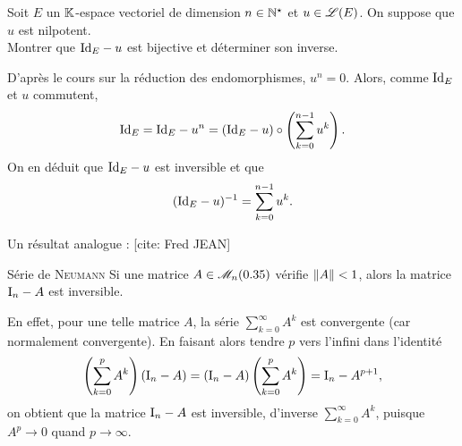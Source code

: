 \begin{exercice}
    Soit $E$ un $\mathbb{K}$-espace vectoriel de dimension $n \in \mathbb{N}^\star$ et $u \in \mathscr{L}(E)$. On suppose que $u$ est nilpotent. \\
    Montrer que $\mathrm{Id}_E - u$ est bijective et déterminer son inverse.
\end{exercice}


\begin{solution}
    D'après le cours sur la réduction des endomorphismes, $u^n = 0$. Alors, comme $\mathrm{Id}_E$ et $u$ commutent, 
    $$\mathrm{Id}_E = \mathrm{Id}_E - u^n = (\mathrm{Id}_E - u) \circ \left( \sum_{k = 0}^{n-1} u^k \right).$$
    On en déduit que $\mathrm{Id}_E - u$ est inversible et que 
    $$(\mathrm{Id}_E - u)^{-1} = \sum_{k = 0}^{n-1} u^k.$$
\end{solution}

Un résultat analogue : [cite: Fred JEAN]\\
\begin{prop}{Série de \textsc{Neumann}}
    Si une matrice $A \in \mathscr{M}_n(0.35)$ vérifie $\Vert A \Vert < 1$, alors la matrice $\mathrm{I}_n - A$ est inversible. 
\end{prop}

\begin{preuve}
    En effet, pour une telle matrice $A$, la série $\sum\limits_{k=0}^\infty A^k$ est convergente (car normalement convergente). En faisant alors tendre $p$ vers l'infini dans l'identité
    $$\left( \sum_{k=0}^p A^k \right) (\mathrm{I}_n - A) = (\mathrm{I}_n - A) \left( \sum_{k=0}^p A^k \right) = \mathrm{I}_n - A^{p+1},$$
    on obtient que la matrice $\mathrm{I}_n - A$ est inversible, d'inverse $\sum\limits_{k=0}^\infty A^k$, puisque $A^p \to 0$ quand $p \to \infty$.
\end{preuve}